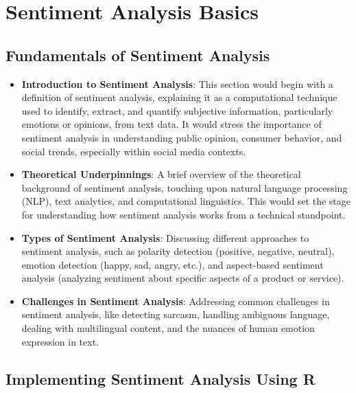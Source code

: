 \documentclass[
]{book}
\providecommand{\tightlist}{%
  \setlength{\itemsep}{0pt}\setlength{\parskip}{0pt}}
\begin{document}
\hypertarget{sentiment-analysis-basics}{%
\chapter{Sentiment Analysis Basics}\label{sentiment-analysis-basics}}

\hypertarget{fundamentals-of-sentiment-analysis}{%
\section*{Fundamentals of Sentiment Analysis}\label{fundamentals-of-sentiment-analysis}}

\begin{itemize}
\tightlist
\item
  \textbf{Introduction to Sentiment Analysis}: This section would begin with a definition of sentiment analysis, explaining it as a computational technique used to identify, extract, and quantify subjective information, particularly emotions or opinions, from text data. It would stress the importance of sentiment analysis in understanding public opinion, consumer behavior, and social trends, especially within social media contexts.
\item
  \textbf{Theoretical Underpinnings}: A brief overview of the theoretical background of sentiment analysis, touching upon natural language processing (NLP), text analytics, and computational linguistics. This would set the stage for understanding how sentiment analysis works from a technical standpoint.
\item
  \textbf{Types of Sentiment Analysis}: Discussing different approaches to sentiment analysis, such as polarity detection (positive, negative, neutral), emotion detection (happy, sad, angry, etc.), and aspect-based sentiment analysis (analyzing sentiment about specific aspects of a product or service).
\item
  \textbf{Challenges in Sentiment Analysis}: Addressing common challenges in sentiment analysis, like detecting sarcasm, handling ambiguous language, dealing with multilingual content, and the nuances of human emotion expression in text.
\end{itemize}

\hypertarget{implementing-sentiment-analysis-using-r}{%
\section*{Implementing Sentiment Analysis Using R}\label{implementing-sentiment-analysis-using-r}}
\end{document}
